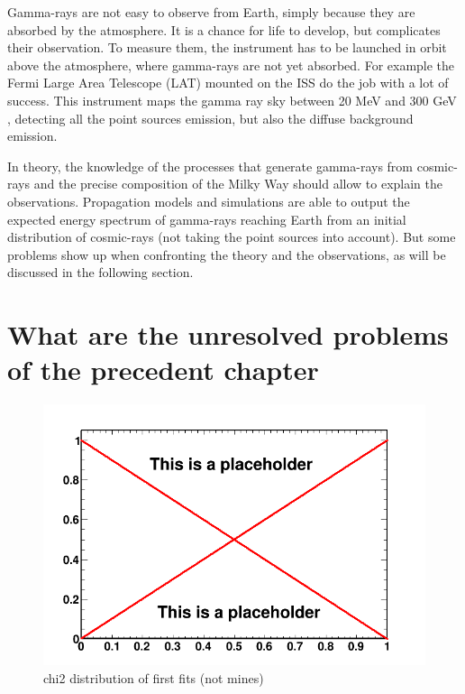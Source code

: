 Gamma-rays are not easy to observe from Earth, simply because they are absorbed by the atmosphere. It is a chance for life to develop, but complicates their observation. To measure them, the instrument has to be launched in orbit above the atmosphere, where gamma-rays are not yet absorbed. For example the Fermi Large Area Telescope (LAT) mounted on the ISS do the job with a lot of success. This instrument maps the gamma ray sky between 20 MeV and 300 GeV , detecting all the point sources emission, but also the diffuse background emission.




In theory, the knowledge of the processes that generate gamma-rays from cosmic-rays and the precise composition of the Milky Way should allow to explain the observations. Propagation models and simulations are able to output the expected energy spectrum of gamma-rays reaching Earth from an initial distribution of cosmic-rays (not taking the point sources into account). But some problems show up when confronting the theory and the observations, as will be discussed in the following section.



\section{What are the unresolved problems of the precedent chapter}
%	
%
\begin{figure}
 \centering
 \includegraphics[width=.9\linewidth]{pic/dummy.png}
 \caption{chi2 distribution of first fits (not mines)}
 \label{fig:first_BKGonly_fits}
\end{figure}



